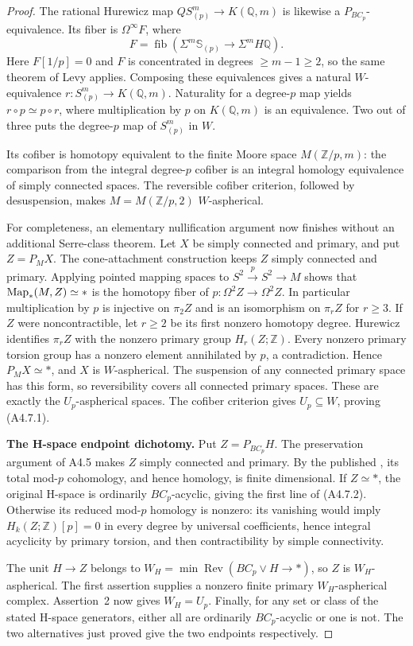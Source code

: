 \begin{proof}
The rational Hurewicz map
$QS^m_{(p)}\to K(\mathbb Q,m)$ is likewise a
$P_{BC_p}$-equivalence.  Its fiber is $\Omega^\infty F$, where
\[
 F=\operatorname{fib}(\Sigma^m\mathbb S_{(p)}
                              \longrightarrow\Sigma^mH\mathbb Q).
 \tag{A4.7.7}
\]
Here $F[1/p]=0$ and $F$ is concentrated in degrees
$\geq m-1\geq2$, so the same theorem of Levy applies.
Composing these equivalences gives a natural $W$-equivalence
$r:S^m_{(p)}\to K(\mathbb Q,m)$.  Naturality for a degree-$p$
map yields $r\circ p\simeq p\circ r$, where multiplication
by $p$ on $K(\mathbb Q,m)$ is an equivalence.  Two out of
three puts the degree-$p$ map of $S^m_{(p)}$ in $W$.

Its cofiber is homotopy equivalent to the finite Moore space
$M(\mathbb Z/p,m)$: the comparison from the integral
degree-$p$ cofiber is an integral homology equivalence of
simply connected spaces.  The reversible cofiber criterion,
followed by desuspension, makes $M=M(\mathbb Z/p,2)$
$W$-aspherical.

For completeness, an elementary nullification argument now
finishes without an additional Serre-class theorem.  Let $X$
be simply connected and primary, and put $Z=P_MX$.
The cone-attachment construction keeps $Z$ simply connected
and primary.  Applying pointed mapping spaces to
$S^2\xrightarrow{p}S^2\to M$ shows that
$\operatorname{Map}_*(M,Z)\simeq *$ is the homotopy fiber of
$p:\Omega^2 Z\to\Omega^2 Z$.  In particular multiplication
by $p$ is injective on $\pi_2Z$ and is an isomorphism on
$\pi_rZ$ for $r\geq3$.  If $Z$ were noncontractible, let
$r\geq2$ be its first nonzero homotopy degree.  Hurewicz
identifies $\pi_rZ$ with the nonzero primary group $H_r(Z;\mathbb Z)$.
Every nonzero primary torsion group has a nonzero element
annihilated by $p$, a contradiction.  Hence $P_MX\simeq *$,
and $X$ is $W$-aspherical.  The suspension of any connected
primary space has this form, so reversibility covers all
connected primary spaces.  These are exactly the $U_p$-aspherical
spaces.  The cofiber criterion gives $U_p\subseteq W$, proving
\textup{(A4.7.1)}.

\par\medskip\noindent\textbf{The H-space endpoint dichotomy.}\quad
Put $Z=P_{BC_p}H$.  The preservation argument of A4.5 makes
$Z$ simply connected and primary.  By the published
\citet[Theorem~7.2]{A4CCSDeconstruct2007}, its total mod-$p$
cohomology, and hence homology, is finite dimensional.
If $Z\simeq *$, the original H-space is ordinarily
$BC_p$-acyclic, giving the first line of \textup{(A4.7.2)}.
Otherwise its reduced mod-$p$ homology is nonzero: its vanishing
would imply $H_k(Z;\mathbb Z)[p]=0$ in every degree by universal
coefficients, hence integral acyclicity by primary torsion,
and then contractibility by simple connectivity.

The unit $H\to Z$ belongs to
$W_H=\min\operatorname{Rev}(BC_p\vee H\to*)$, so $Z$ is
$W_H$-aspherical.  The first assertion supplies a nonzero finite
primary $W_H$-aspherical complex.  Assertion~2 now gives
$W_H=U_p$.  Finally, for any set or class of the stated
H-space generators, either all are ordinarily $BC_p$-acyclic
or one is not.  The two alternatives just proved give the
two endpoints respectively.
\end{proof}

